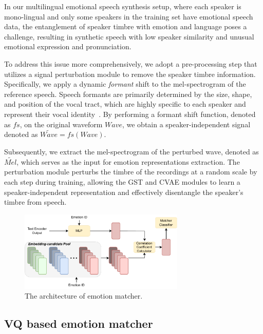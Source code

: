 \documentclass[journal,comsoc]{IEEEtran}
\begin{document}
In our multilingual emotional speech synthesis setup, where each speaker is mono-lingual and only some speakers in the training set have emotional speech data, the entanglement of speaker timbre with emotion and language poses a challenge, resulting in synthetic speech with low speaker similarity and unusual emotional expression and pronunciation.

To address this issue more comprehensively, we adopt a pre-processing step that utilizes a signal perturbation module to remove the speaker timbre information. Specifically, we apply a dynamic \textit{formant} shift to the mel-spectrogram of the reference speech. Speech formants are primarily determined by the size, shape, and position of the vocal tract, which are highly specific to each speaker and represent their vocal identity~\cite{DBLP:journals/taslp/YooLY15}. By performing a formant shift function, denoted as $fs$, on the original waveform $Wave$, we obtain a speaker-independent signal denoted as $\widetilde{Wave} = fs (Wave)$.

Subsequently, we extract the mel-spectrogram of the perturbed wave, denoted as $\widetilde{Mel}$, which serves as the input for emotion representations extraction. The perturbation module perturbs the timbre of the recordings at a random scale by each step during training, allowing the GST and CVAE modules to learn a speaker-independent representation and effectively disentangle the speaker's timbre from speech.

\begin{figure}[htb]

\begin{minipage}[b]{\linewidth}
    \centering
    \includegraphics[width=0.7\textwidth]{emotion_matcher.drawio1.pdf}
\end{minipage}
\caption{The architecture of emotion matcher.}
\label{fig_2}

\end{figure}

\subsection{VQ based emotion matcher}
\end{document}
